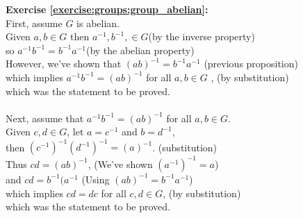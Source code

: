 \noindent\textbf{Exercise \ref{exercise:groups:group_abelian}:}
\\
First, assume $G$ is abelian.\\
Given $a,b \in G$ then $a^{-1},b^{-1}, \in G$\quad (by the inverse property)\\
so $a^{-1}b^{-1} = b^{-1}a^{-1}$\quad (by the abelian property)\\
However, we've shown that $(ab)^{-1} = b^{-1}a^{-1}$ \quad (previous proposition)\\
which implies $a^{-1}b^{-1} = (ab)^{-1}$ for all $a,b \in G$ , \quad (by substitution)\\
which was the statement to be proved.\\
\\
Next, assume that $a^{-1}b^{-1} = (ab)^{-1}$ for all $a,b \in G$.\\
Given $c,d \in G$, let $a=c^{-1}$ and $b=d^{-1}$,\\
then $(c^{-1})^{-1}(d^{-1})^{-1} = (a)^{-1}$. \quad (substitution)\\
Thus $cd = (ab)^{-1}$, \quad (We've shown $(a^{-1})^{-1} = a$)\\
and $cd = b^{-1}(a^{-1}$ \quad (Using $(ab)^{-1} = b^{-1}a^{-1}$)\\
which implies $cd = dc$ for all $c,d \in G$, \quad (by substitution)\\
which was the statement to be proved.
\\

